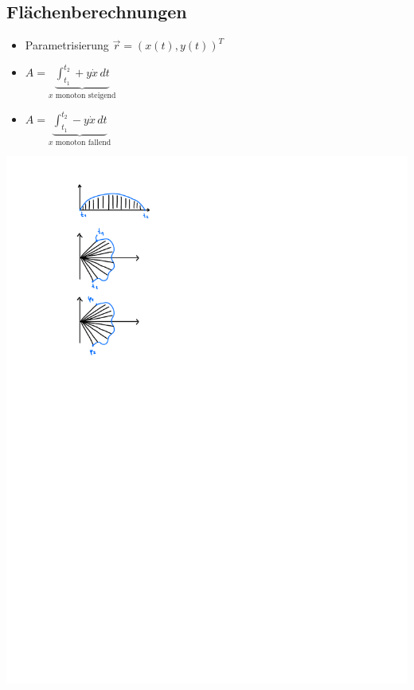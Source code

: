 \subsection{Flächenberechnungen}
    \vspace{0.5em}
    \begin{itemize}
        \item Parametrisierung $\vec{r}=(x(t),y(t))^T$ \hfill
    \end{itemize}
    \begin{minipage}{0.65\linewidth}
        \vspace{-1em}
        \begin{itemize}
        \item[]  $\displaystyle A= \underbrace{\int_{t_1}^{t_2} + y \dot{x} \, dt}_{x \textrm{ monoton steigend}}$
        \item[]  $\displaystyle A= \underbrace{\int_{t_1}^{t_2} - y \dot{x} \, dt}_{x \textrm{ monoton fallend}}$
        \end{itemize}
    \end{minipage}
    \begin{minipage}{0.34\linewidth}
        \includegraphics[width=0.7\linewidth]{src/11_Integralrechnung/param.pdf}
    \end{minipage}

